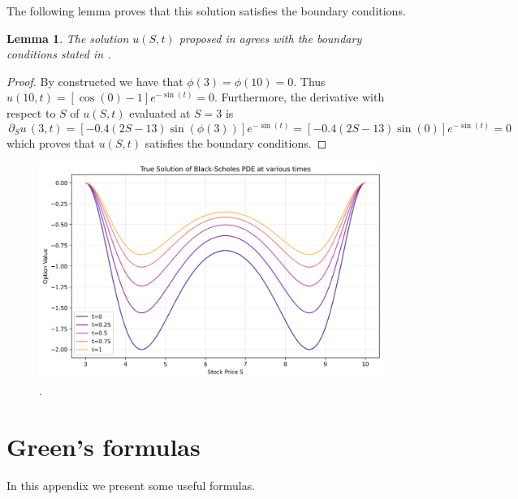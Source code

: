 \documentclass{article}
\newtheorem{thm}{Theorem}[section]
\newtheorem{lemma}[thm]{Lemma}
\newcommand{\darg}[2]{\ensuremath{\, \partial_{#2}#1} \, }
\newcommand{\dS}[1]{\ensuremath{\darg{#1}{S}}}
\newcommand{\dSu}{\dS{u}}
\begin{document}
The following lemma proves that this solution satisfies the boundary conditions.
\begin{lemma}
    The solution $u(S,t)$ proposed in  agrees with the boundary conditions stated in .
\end{lemma}
\begin{proof}
    By constructed we have that $\phi(3)=\phi(10)=0$. Thus $u(10,t)=\left[\cos\left(0\right)-1\right]e^{-\sin(t)} = 0$. Furthermore, the derivative with respect to $S$ of $u(S,t)$ evaluated at $S = 3$ is
    \begin{equation*}
        \dSu(3, t) = \left[-0.4 (2S - 13) \sin(\phi(3))\right]e^{-\sin (t)} = \left[-0.4 (2S - 13) \sin(0)\right]e^{-\sin (t)} = 0
    \end{equation*}
    which proves that $u(S,t)$ satisfies the boundary conditions.
\end{proof}

\begin{figure}[!ht]
    \centering
    \includegraphics[width=0.75\linewidth]{code/images/true_constructed_cos.png}
    \caption{.}
    \label{fig:plot_cos}
\end{figure}



\appendix
\section{Green's formulas}
In this appendix we present some useful formulas.

\end{document}

